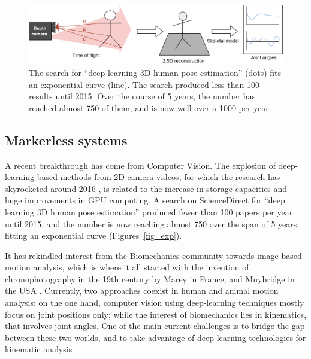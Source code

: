 \begin{figure}[hbtp]
	\centering
	\def\svgwidth{1\columnwidth}
	\fontsize{10pt}{10pt}\selectfont
	\includegraphics[width=\linewidth]{"../Chap1/Figures/Depth.png"}
	\caption{The search for “deep learning 3D human pose estimation” (dots) fits an exponential curve (line). The search produced less than 100 results until 2015. Over the course of 5 years, the number has reached almost 750 of them, and is now well over a 1000 per year.}
	\label{fig_depth}
\end{figure}
\FloatBarrier




\subsection{Markerless systems}

A recent breakthrough has come from Computer Vision. The explosion of deep-learning based methods from 2D camera videos, for which the research has skyrocketed around 2016 \cite{Wang2021a}, is related to the increase in storage capacities and huge improvements in GPU computing. A search on ScienceDirect for “deep learning 3D human pose estimation” produced fewer than 100 papers per year until 2015, and the number is now reaching almost 750 over the span of 5 years, fitting an exponential curve (Figures~\ref{fig_exp}).

It has rekindled interest from the Biomechanics community towards image-based motion analysis, which is where it all started with the invention of chronophotography in the 19th century by Marey in France, and Muybridge in the USA \cite{Baker2007}. Currently, two approaches coexist in human and animal motion analysis: on the one hand, computer vision using deep-learning techniques mostly focus on joint positions only; while the interest of biomechanics lies in kinematics, that involves joint angles. One of the main current challenges is to bridge the gap between these two worlds, and to take advantage of deep-learning technologies for kinematic analysis \cite{Cronin2021,Seethapathi2019}. 

